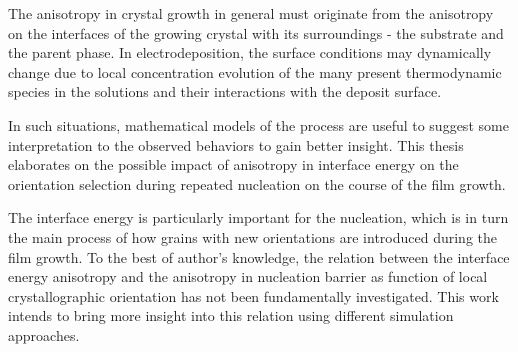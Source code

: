 The anisotropy in crystal growth in general must originate from the anisotropy on the interfaces of the growing crystal with its surroundings - the substrate and the parent phase. In electrodeposition, the surface conditions may dynamically change due to local concentration evolution of the many present thermodynamic species in the solutions and their interactions with the deposit surface. 

In such situations, mathematical models of the process are useful to suggest some interpretation to the observed behaviors to gain better insight. This thesis elaborates on the possible impact of anisotropy in interface energy on the orientation selection during repeated nucleation on the course of the film growth. 


The interface energy is particularly important for the nucleation, which is in turn the main process of how grains with new orientations are introduced during the film growth. To the best of author's knowledge, the relation between the interface energy anisotropy and the anisotropy in nucleation barrier as function of local crystallographic orientation has not been fundamentally investigated. This work intends to bring more insight into this relation using different simulation approaches.


